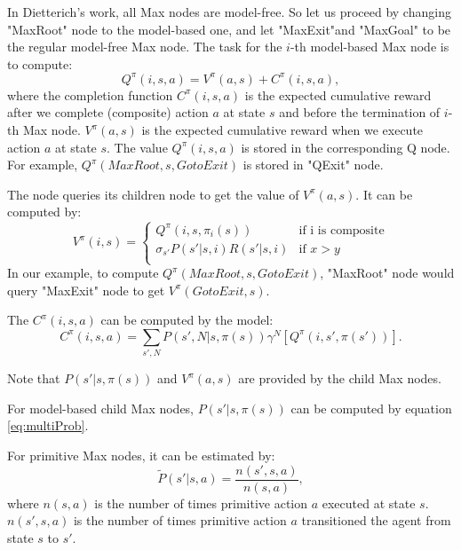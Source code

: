 \documentclass{article} %
\begin{document}
In Dietterich's work, all Max nodes are model-free. 
So let us proceed by changing "MaxRoot" node to the model-based one, and let "MaxExit"and "MaxGoal"
to be the regular model-free Max node.
The task for the $i$-th model-based Max node is to compute:
\begin{equation}
    Q^{\pi}(i, s, a) = V^{\pi}(a, s) + C^{\pi}(i, s, a),
\end{equation}
where the completion function $C^{\pi}(i, s, a)$ is the expected cumulative reward after
we complete (composite) action $a$ at state $s$ and before the termination of $i$-th Max node.
$V^{\pi}(a, s)$ is the 
expected cumulative reward when we execute action $a$ at state $s$.
The value $Q^{\pi}(i, s, a)$ is stored in the corresponding Q node.
For example, $Q^{\pi}(MaxRoot, s, GotoExit)$ is stored in "QExit" node.

The node queries its children node to get the value of $V^{\pi}(a, s)$.
It can be computed by:
\begin{equation}
    V^{\pi}(i, s) = \left\{\begin{array}{ll}
                    Q^{\pi}(i, s, \pi_i(s)) & \mbox{if i is composite} \\
                    \sigma_{s'} P(s'|s, i)R(s'|s, i) & \mbox{if $x>y$} \\  
                    \end{array} \right.
    \label{eq:V}
\end{equation}
In our example, to compute $Q^{\pi}(MaxRoot, s, GotoExit)$, "MaxRoot" node would query 
"MaxExit" node to get $V^{\pi}(GotoExit, s)$.

The $C^{\pi}(i, s, a)$ can be computed by the model:
\begin{equation}
    C^{\pi}(i, s, a) = \sum_{s', N}P(s', N|s, \pi(s))\gamma^N[Q^{\pi}(i, s', \pi(s'))].
    \label{eq:C}
\end{equation}

Note that $P(s'|s, \pi(s))$ and $V^{\pi}(a, s)$ are provided by the child Max nodes.

For model-based child Max nodes, $P(s'|s, \pi(s))$ can be computed by equation \ref{eq:multiProb}.

For primitive Max nodes, it can be estimated by:
\begin{equation}
    \tilde{P}(s'|s, a)  = \frac{n(s', s, a)}{n(s, a)},
    \label{eq:countP}
\end{equation}
where $n(s, a)$ is the number of times primitive action $a$ executed 
at state $s$. $n(s', s, a)$ is the number of times primitive action $a$
transitioned the agent from state $s$ to $s'$.
\end{document}
